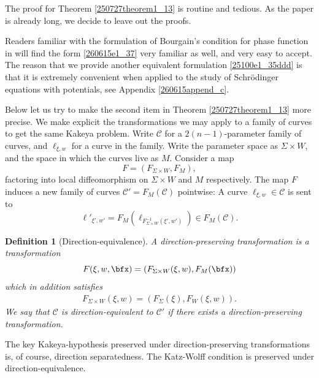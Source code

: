 \documentclass{article}
\numberwithin{equation}{section}
\theoremstyle{plain}
\newtheorem{definition}[theorem]{Definition}
\begin{document}
The proof for Theorem \ref{250727theorem1_13} is routine and tedious. As the paper is already long, we decide to leave out the proofs. 




Readers familiar with the formulation of Bourgain's condition for phase function in \cite{GWZ24} will find the form \eqref{260615e1_37} very familiar as well, and very easy to accept. The reason that we provide another equivalent formulation \eqref{25100e1_35ddd} is that it is extremely convenient when applied to the study of Schr\"odinger equations with potentials, see Appendix  \ref{260615append_c}. 





Below let us try to make the second item in Theorem \ref{250727theorem1_13} more precise. We make explicit the transformations we may apply to a family of curves to get the same Kakeya problem. Write $\mathcal C$ for a $2(n-1)$-parameter family of curves, and $\ell_{\xi, w}$ for a curve in the family. Write the parameter space as $\Sigma \times W$, and the space in which the curves live as $M$. Consider a map 
\begin{equation}
F =(F_{\Sigma \times W},F_{M}),
\end{equation}
factoring into local diffeomorphism on $\Sigma \times W$ and $M$ respectively. The map $F$ induces a new family of curves $\mathcal C' = F_M(\mathcal C)$ pointwise: 
  A curve $\ell_{\xi,w} \in \mathcal C$ is sent to 
  \begin{equation}
      \ell'_{\xi', w'} = F_M(\ell_{F^{-1}_{\Sigma\times W}(\xi', w')}) \in  F_M(\mathcal{C}).
  \end{equation}



\begin{definition}[Direction-equivalence]
    A direction-preserving transformation is a  transformation
    \begin{equation}
    F(\xi, w, \bfx) = (F_{\Sigma \times W}(\xi,w), F_M(\bfx))
    \end{equation}
     which in addition satisfies 
    \begin{align}
        F_{\Sigma \times W}(\xi, w) = (F_\Sigma(\xi), F_W(\xi, w)).
    \end{align}
    We say that $\mathcal C$ is direction-equivalent to $\mathcal C'$ if there exists a direction-preserving transformation. 
\end{definition}

The key Kakeya-hypothesis preserved under direction-preserving transformations is, of course, direction separatedness. The Katz-Wolff condition is preserved under direction-equivalence. \\
\end{document}
